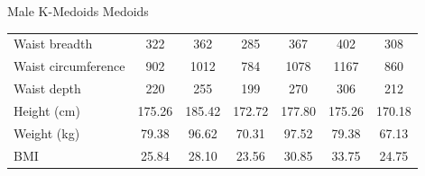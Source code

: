 \documentclass[10pt]{beamer}
\begin{document}
\begin{frame}{Male K-Medoids Medoids}
\begin{tabular}{lcccccc}
		Waist breadth                & 322                                  & 362        & 285        & 367        & 402        & 308        \\
		Waist circumference          & 902                                  & 1012       & 784        & 1078       & 1167       & 860        \\
		Waist depth                  & 220                                  & 255        & 199        & 270        & 306        & 212        \\
		\hline
		Height (cm)                  & 175.26                               & 185.42     & 172.72     & 177.80     & 175.26     & 170.18     \\
		Weight (kg)                  & 79.38                                & 96.62      & 70.31      & 97.52      & 79.38      & 67.13      \\
		BMI                          & 25.84                                & 28.10      & 23.56      & 30.85      & 33.75      & 24.75
	\end{tabular}
\end{frame}
\end{document}
